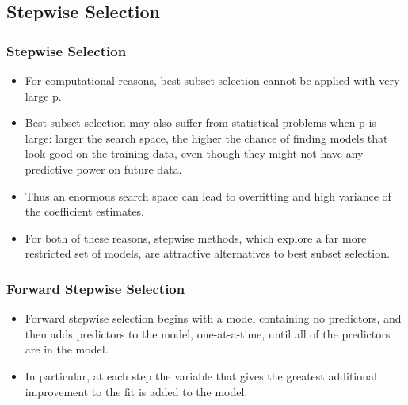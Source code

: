 \documentclass[
  shownotes,
  xcolor={svgnames},
  hyperref={colorlinks,citecolor=DarkBlue,linkcolor=DarkRed,urlcolor=DarkBlue}
  , aspectratio=169]{beamer}
\begin{document}
\subsection{Stepwise Selection}
\begin{frame}[fragile]
\frametitle{Stepwise Selection}
 
 \begin{itemize}
\item For computational reasons, best subset selection cannot be applied with very large p. 
\medskip
\item Best subset selection may also suffer from statistical problems when p is large: larger the search space, the higher the chance of finding models that look good on the training data, even though they might not have any predictive power on future data.
\medskip
\item Thus an enormous search space can lead to overfitting and high variance of the coefficient estimates.
\medskip
\item For both of these reasons, stepwise methods, which explore a far more restricted set of models, are attractive alternatives to best subset selection.
\end{itemize}

\end{frame}
\begin{frame}[fragile]
\frametitle{Forward Stepwise Selection}

 \begin{itemize}
\item  Forward stepwise selection begins with a model containing no predictors, and then adds predictors to the model, one-at-a-time, until all of the predictors are in the model.
\bigskip
\item   In particular, at each step the variable that gives the greatest additional improvement to the fit is added to the model.
\end{itemize}

\end{frame}
\end{document}
